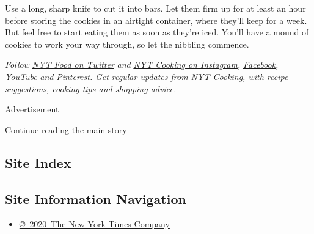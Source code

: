 Use a long, sharp knife to cut it into bars. Let them firm up for at
least an hour before storing the cookies in an airtight container, where
they'll keep for a week. But feel free to start eating them as soon as
they're iced. You'll have a mound of cookies to work your way through,
so let the nibbling commence.

\emph{Follow} \href{https://twitter.com/nytfood}{\emph{NYT Food on
Twitter}} \emph{and}
\href{https://www.instagram.com/nytcooking/}{\emph{NYT Cooking on
Instagram}}\emph{,}
\href{https://www.facebookcorewwwi.onion/nytcooking/}{\emph{Facebook}}\emph{,}
\href{https://www.youtube.com/nytcooking}{\emph{YouTube}} \emph{and}
\href{https://www.pinterest.com/nytcooking/}{\emph{Pinterest}}\emph{.}
\href{https://www.nytimes3xbfgragh.onion/newsletters/cooking}{\emph{Get
regular updates from NYT Cooking, with recipe suggestions, cooking tips
and shopping advice}}\emph{.}

Advertisement

\protect\hyperlink{after-bottom}{Continue reading the main story}

\hypertarget{site-index}{%
\subsection{Site Index}\label{site-index}}

\hypertarget{site-information-navigation}{%
\subsection{Site Information
Navigation}\label{site-information-navigation}}

\begin{itemize}
\tightlist
\item
  \href{https://help.nytimes3xbfgragh.onion/hc/en-us/articles/115014792127-Copyright-notice}{©~2020~The
  New York Times Company}
\end{itemize}

